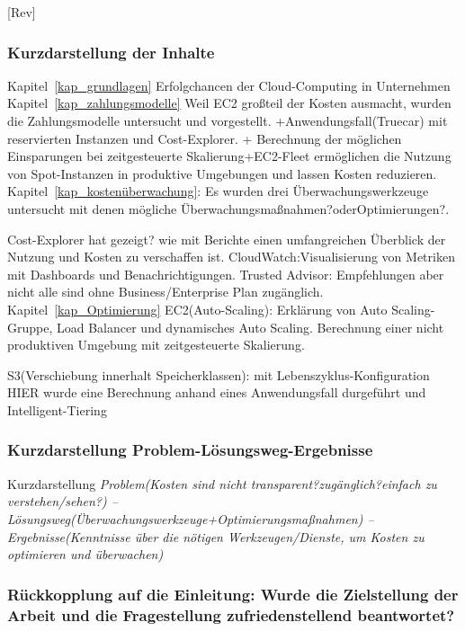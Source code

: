 [Rev]
\subsubsection*{Kurzdarstellung der Inhalte}
Kapitel~\ref{kap_grundlagen} Erfolgchancen der Cloud-Computing in Unternehmen\\
Kapitel~\ref{kap_zahlungsmodelle} Weil EC2 großteil der Kosten ausmacht, wurden die Zahlungsmodelle untersucht und vorgestellt. +Anwendungsfall(Truecar) mit reservierten Instanzen und Cost-Explorer. + Berechnung der möglichen Einsparungen bei zeitgesteuerte Skalierung+EC2-Fleet ermöglichen die Nutzung von Spot-Instanzen in produktive Umgebungen und lassen Kosten reduzieren.\\
Kapitel~\ref{kap_kostenüberwachung}: Es wurden drei Überwachungswerkzeuge untersucht mit denen mögliche Überwachungsmaßnahmen?oderOptimierungen?.

Cost-Explorer hat gezeigt? wie mit Berichte einen umfangreichen Überblick der Nutzung und Kosten zu verschaffen ist. 
CloudWatch:Visualisierung von Metriken mit Dashboards und Benachrichtigungen.
Trusted Advisor: Empfehlungen aber nicht alle sind ohne Business/Enterprise Plan zugänglich.
\\
Kapitel~\ref{kap_Optimierung} EC2(Auto-Scaling): 
Erklärung von Auto Scaling-Gruppe, Load Balancer und dynamisches Auto Scaling.
Berechnung einer nicht produktiven Umgebung mit zeitgesteuerte Skalierung.

S3(Verschiebung innerhalt Speicherklassen): mit Lebenszyklus-Konfiguration HIER wurde eine Berechnung anhand eines Anwendungsfall durgeführt und Intelligent-Tiering
\\
\subsubsection*{Kurzdarstellung Problem-Lösungsweg-Ergebnisse}
Kurzdarstellung \textit{Problem(Kosten sind nicht transparent?zugänglich?einfach zu verstehen/sehen?) – Lösungsweg(Überwachungswerkzeuge+Optimierungsmaßnahmen) – Ergebnisse(Kenntnisse über die nötigen Werkzeugen/Dienste, um Kosten zu optimieren und überwachen)}
\\
\subsubsection*{Rückkopplung auf die Einleitung: Wurde die Zielstellung der Arbeit und die Fragestellung zufriedenstellend beantwortet?}
